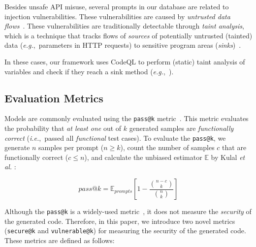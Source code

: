 \documentclass[pdflatex,sn-mathphys-ay]{sn-jnl}
\newcommand{\ie}{\textit{i.e.},\ }
\newcommand{\eg}{\textit{e.g.},\ }
\newcommand{\etal}{\textit{et al.} }
\begin{document}
Besides unsafe API misuse, several prompts in our database are related to injection vulnerabilities. These vulnerabilities are caused by \textit{untrusted data flows}~\cite{yamaguchi2015automatic, livshits2005finding}. These vulnerabilities are traditionally detectable through \textit{taint analysis}, which is a technique that tracks flows of \textit{sources} of potentially untrusted (tainted) data (\eg parameters in HTTP requests) to sensitive program areas (\textit{sinks})~\cite{schwartz2010all}. 

In these cases, our framework uses CodeQL to perform (static) taint analysis of variables and check if they reach a sink method (\eg {}).



\subsection{Evaluation Metrics}\label{subsec:SecurityChecker}

Models are commonly evaluated using the \texttt{pass@k} metric~\cite{chen2021codex, kulal2019spoc}. This metric evaluates the probability that \textit{at least one} out of $k$ generated samples are \textit{functionally correct} (\ie passed all \textit{functional} test cases). 
To evaluate the \texttt{pass@k}, we generate $n$ samples per prompt ($n \geq k$), count the number of samples $c$ that are functionally correct ($c \leq n$), and calculate the unbiased estimator $\mathbb{E}$ by Kulal \etal \cite{kulal2019spoc}:

\begin{equation}
  pass@k = \mathbb{E}_{prompts}\left[1- \frac{\binom {n-c}k}{\binom nk} \right]
\end{equation}




Although the \texttt{pass@k} is a widely-used metric~\cite{kulal2019spoc,chen2021codex}, it does not measure the \textit{security} of the generated code. Therefore, in this paper, we introduce two novel metrics (\texttt{secure@k} and \texttt{vulnerable@k}) for measuring the security of the generated code. These metrics are defined as follows:
\end{document}
